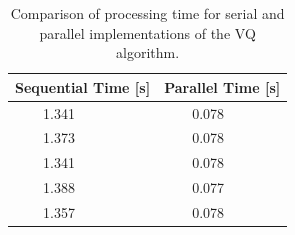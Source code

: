 \documentclass{llncs}
\begin{document}
\begin{table}
\centering
\begin{tabular}{|l|l|}
\hline
Sequential Time [s] & Parallel Time [s]\\
\hline
$\qquad$1.341 & $\qquad$0.078\\
$\qquad$1.373 & $\qquad$0.078\\
$\qquad$1.341 & $\qquad$0.078\\
$\qquad$1.388 & $\qquad$0.077\\
$\qquad$1.357 & $\qquad$0.078\\
\hline
\end{tabular}
\caption{Comparison of processing time for serial and parallel implementations of the VQ algorithm.}
\label{tab:Times}
\end{table}







\end{document}
